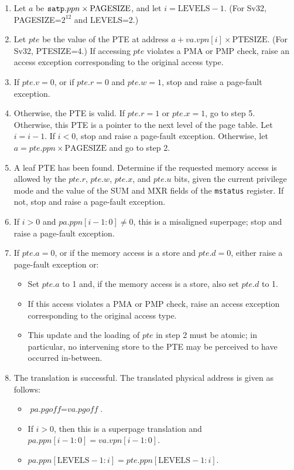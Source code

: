 \begin{enumerate}

\item Let $a$ be ${\tt satp}.ppn \times \textrm{PAGESIZE}$, and let $i=\textrm{LEVELS} - 1$. (For Sv32, PAGESIZE=$2^{12}$ and LEVELS=2.)

\item Let $pte$ be the value of the PTE at address
  $a+va.vpn[i]\times \textrm{PTESIZE}$. (For Sv32, PTESIZE=4.)
  If accessing $pte$ violates a PMA or PMP check, raise an
  access exception corresponding to the original access type.

\item If $pte.v=0$, or if $pte.r=0$ and $pte.w=1$, stop and raise a page-fault exception.

\item Otherwise, the PTE is valid.
  If $pte.r=1$ or $pte.x=1$, go to step 5.
  Otherwise, this PTE is a pointer to the next level of the page table.  Let
  $i=i-1$.  If $i<0$, stop and raise a page-fault exception.  Otherwise, let
  $a=pte.ppn \times \textrm{PAGESIZE}$ and go to step 2.

\item A leaf PTE has been found.  Determine if the requested memory access is
  allowed by the $pte.r$, $pte.w$, $pte.x$, and $pte.u$ bits, given the
  current privilege mode and the value of the SUM and MXR fields of
  the {\tt mstatus} register.  If not, stop and raise a page-fault exception.

\item If $i>0$ and $pa.ppn[i-1:0]\neq 0$, this is a misaligned superpage;
      stop and raise a page-fault exception.

\item If $pte.a=0$, or if the memory access is a store and $pte.d=0$, either
  raise a page-fault exception or:
  \begin{itemize}
  \item Set $pte.a$ to 1 and, if the memory access is a store, also set
    $pte.d$ to 1.
  \item If this access violates a PMA or PMP check, raise an access exception
    corresponding to the original access type.
  \item This update and the loading of $pte$ in step 2 must be atomic; in
    particular, no intervening store to the PTE may be perceived to have
    occurred in-between.
  \end{itemize}

\item The translation is successful. The translated physical address is
  given as follows:
\begin{itemize}
\item $\textit{pa.pgoff} = \textit{va.pgoff}$.
\item If $i>0$, then this is a superpage translation and $pa.ppn[i-1:0]=va.vpn[i-1:0]$.
\item $pa.ppn[\textrm{LEVELS} - 1:i] = pte.ppn[\textrm{LEVELS} - 1:i]$.
\end{itemize}

\end{enumerate}

